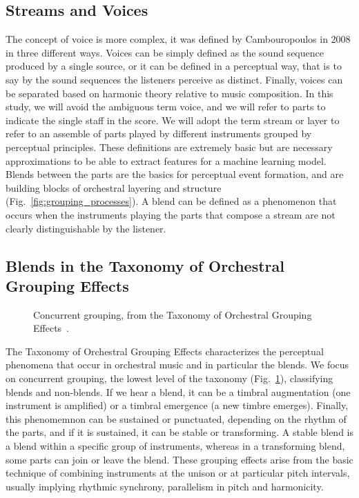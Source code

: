 \documentclass{article}
\newcommand{\fm}[1]{\textcolor{magenta}{FM: << #1 >>}}
\begin{document}
\subsection{Streams and Voices}

The concept of voice is more complex, it was defined by Cambouropoulos in 2008 in three different ways.\cite{cambouropoulos}
Voices can be simply defined as the sound sequence produced by a single source, or it can be defined in a perceptual way, that is to say by the sound sequences the listeners perceive as distinct.
Finally, voices can be separated based on harmonic theory relative to music composition.
In this study, we will avoid the ambiguous term voice, and we will refer to parts to indicate the single staff in the score.
%
We will adopt the term stream or layer to refer to an assemble of parts played by different instruments grouped by perceptual principles.
These definitions are extremely basic but are necessary approximations to be able to extract features for a machine learning model.
Blends between the parts are the basics for perceptual event formation, and are building blocks of orchestral layering and structure (Fig.~\ref{fig:grouping_processes}).
A blend can be defined as a phenomenon that occurs when the instruments playing the parts that compose a stream are not clearly distinguishable by the listener.

\subsection{Blends in the Taxonomy of Orchestral Grouping Effects}

\begin{figure}[ht]
  \centerline{}
  \caption{Concurrent grouping, from the Taxonomy of Orchestral Grouping Effects~\cite{mcadams_taxonomy_2022}.}
  \label{fig:conc_grouping}
\end{figure}


The Taxonomy of Orchestral Grouping Effects characterizes the perceptual phenomena that occur in orchestral music and in particular the blends.
We focus on concurrent grouping, the lowest level of the taxonomy (Fig.~\ref{fig:conc_grouping}), classifying blends and non-blends.
If we hear a blend, it can be a timbral augmentation (one instrument is amplified) or a timbral emergence (a new timbre emerges).
Finally, this phenomemnon can be sustained or punctuated, depending on the rhythm of the parts, and if it is sustained, it can be stable or transforming.
A stable blend is a blend within a specific group of instruments, whereas in a transforming blend, some parts can join or leave the blend.
These grouping effects arise from the basic technique of combining instruments at the unison or at particular pitch intervals, usually implying rhythmic synchrony, parallelism in pitch and harmonicity.
\end{document}
